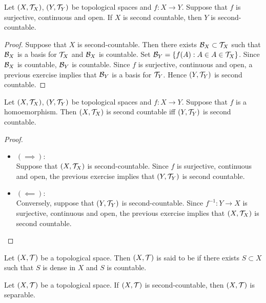 \documentclass{book}
\begin{document}
	\begin{ex}
		Let $(X, \mathcal{T}_X)$, $(Y, \mathcal{T}_Y)$ be topological spaces and $f:X \rightarrow Y$. Suppose that $f$ is surjective, continuous and open. If $X$ is second countable, then $Y$ is second-countable. 
	\end{ex}

	\begin{proof}
		Suppose that $X$ is second-countable. Then there exists $\mathcal{B}_X \subset \mathcal{T}_X$ such that $\mathcal{B}_X$ is a basis for $\mathcal{T}_X$ and $\mathcal{B}_X$ is countable. Set $\mathcal{B}_{Y} = \{f(A):A \in A \in \mathcal{T}_X\}$. Since $\mathcal{B}_X$ is countable, $\mathcal{B}_Y$ is countable. Since $f$ is surjective, continuous and open, a previous exercise implies that $\mathcal{B}_{Y}$ is a basis for $\mathcal{T}_Y$. Hence $(Y, \mathcal{T}_Y)$ is second countable.
	\end{proof}

	\begin{ex}
		Let $(X, \mathcal{T}_X)$, $(Y, \mathcal{T}_Y)$ be topological spaces and $f:X \rightarrow Y$. Suppose that $f$ is a homoemorphism. Then $(X, \mathcal{T}_X)$ is second countable iff $(Y, \mathcal{T}_Y)$ is second countable.
	\end{ex}

	\begin{proof}\
		\begin{itemize}
			\item $(\implies):$ \\
			Suppose that $(X, \mathcal{T}_X)$ is second-countable. Since $f$ is surjective, continuous and open, the previous exercise implies that $(Y, \mathcal{T}_Y)$ is second countable.
			\item $(\impliedby):$ \\
			Conversely, suppose that $(Y, \mathcal{T}_Y)$ is second-countable. Since $f^{-1}: Y \rightarrow X$ is  surjective, continuous and open, the previous exercise implies that $(X, \mathcal{T}_X)$ is second countable.
		\end{itemize}
	\end{proof}

	\begin{defn}
		Let $(X, \mathcal{T})$ be a topological space. Then $(X, \mathcal{T})$ is said to be  if there exists $S \subset X$ such that $S$ is dense in $X$ and $S$ is countable.
	\end{defn}

	\begin{ex}
		Let $(X, \mathcal{T})$ be a topological space. If $(X, \mathcal{T})$ is second-countable, then $(X, \mathcal{T})$ is separable. 
	\end{ex}
\end{document}
